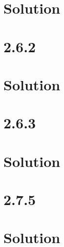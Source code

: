 \documentclass[10pt]{article}
\begin{document}
\section*{Solution}

\section*{2.6.2}

\section*{Solution}

\section*{2.6.3}

\section*{Solution}

\section*{2.7.5}

\section*{Solution}
\end{document}
